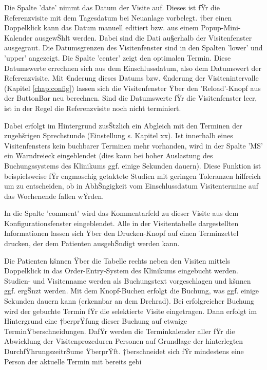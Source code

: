 \documentclass[11pt,oneside]{scrbook}
\begin{document}
Die Spalte 'date' nimmt das Datum der Visite auf. Dieses ist fŸr die Referenzvisite mit dem Tagesdatum bei Neuanlage vorbelegt. †ber einen Doppelklick kann das Datum manuell editiert bzw. aus einem Popup-Mini-Kalender ausgewŠhlt werden. Dabei sind die Dati au§erhalb der Visitenfenster ausgegraut. Die Datumsgrenzen des Visitenfenster sind in den Spalten 'lower' und 'upper' angezeigt. Die Spalte 'center' zeigt den optimalen Termin. Diese Datumswerte errechnen sich aus dem Einschlussdatum, also dem Datumswert der Referenzvisite. Mit €nderung dieses Datums bzw. €nderung der Visitenintervalle (Kapitel  \ref{chap:config}) lassen sich die Visitenfenster Ÿber den  'Reload'-Knopf aus der ButtonBar neu berechnen. Sind die Datumswerte fŸr die Visitenfenster leer, ist in der Regel die Referenzvisite noch nicht terminiert.

Dabei erfolgt im Hintergrund zusŠtzlich ein Abgleich mit den Terminen der zugehšrigen Sprechstunde (Einstellung s. Kapitel xx). Ist innerhalb eines Visitenfensters kein buchbarer Terminen mehr vorhanden, wird in der Spalte 'MS' ein Warndreieck eingeblendet (dies kann bei hoher Auslastung des Buchungssystems des Klinikums ggf. einige Sekunden dauern). Diese Funktion ist beispielsweise fŸr engmaschig getaktete Studien mit geringen Toleranzen hilfreich um zu entscheiden, ob in AbhŠngigkeit vom Einschlussdatum Visitentermine auf das Wochenende fallen wŸrden.

In die Spalte 'comment' wird das Kommentarfeld zu dieser Visite aus dem Konfigurationsfenster eingeblendet. Alle in der Visitentabelle dargestellten Informationen lassen sich Ÿber den Drucken-Knopf auf einen Terminzettel drucken, der dem Patienten ausgehŠndigt werden kann.

Die Patienten kšnnen Ÿber die Tabelle rechts neben den Visiten mittels Doppelklick in das Order-Entry-System des Klinikums eingebucht werden. Studien- und Visitenname werden als Buchungstext vorgeschlagen und kšnnen ggf. ergŠnzt werden. Mit dem Knopf-Buchen erfolgt die Buchung, was  ggf. einige Sekunden dauern kann (erkennbar an dem Drehrad). Bei erfolgreicher Buchung wird der gebuchte Termin fŸr die selektierte Visite  eingetragen. Dann erfolgt im Hintergrund eine †berprŸfung dieser Buchung auf etwaige TerminŸberschneidungen. DafŸr werden die Terminkalender aller fŸr die Abwicklung der Visitenprozeduren Personen auf Grundlage der hinterlegten DurchfŸhrungszeitrŠume ŸberprŸft. †berschneidet sich fŸr mindestens eine Person der aktuelle Termin mit bereits gebi

\end{document}
